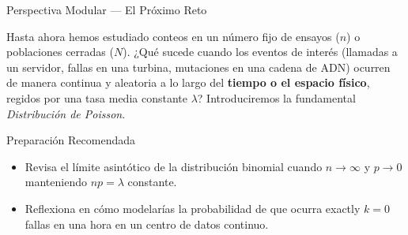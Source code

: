 \documentclass[10pt, aspectratio=169]{beamer}
\begin{document}
\begin{frame}{Perspectiva Modular — El Próximo Reto}
  \scriptsize
  \begin{retoclase}
    Hasta ahora hemos estudiado conteos en un número fijo de ensayos ($n$) o poblaciones cerradas ($N$). ¿Qué sucede cuando los eventos de interés (llamadas a un servidor, fallas en una turbina, mutaciones en una cadena de ADN) ocurren de manera continua y aleatoria a lo largo del \textbf{tiempo o el espacio físico}, regidos por una tasa media constante $\lambda$? Introduciremos la fundamental \emph{Distribución de Poisson}.
  \end{retoclase}

  \vspace{0.08cm}
  \pause
  \begin{alertblock}{Preparación Recomendada}
    \begin{itemize}\itemsep=0.06cm
      \item Revisa el límite asintótico de la distribución binomial cuando $n \to \infty$ y $p \to 0$ manteniendo $np = \lambda$ constante.
      \item Reflexiona en cómo modelarías la probabilidad de que ocurra exactly $k=0$ fallas en una hora en un centro de datos continuo.
    \end{itemize}
  \end{alertblock}
\end{frame}
\end{document}
